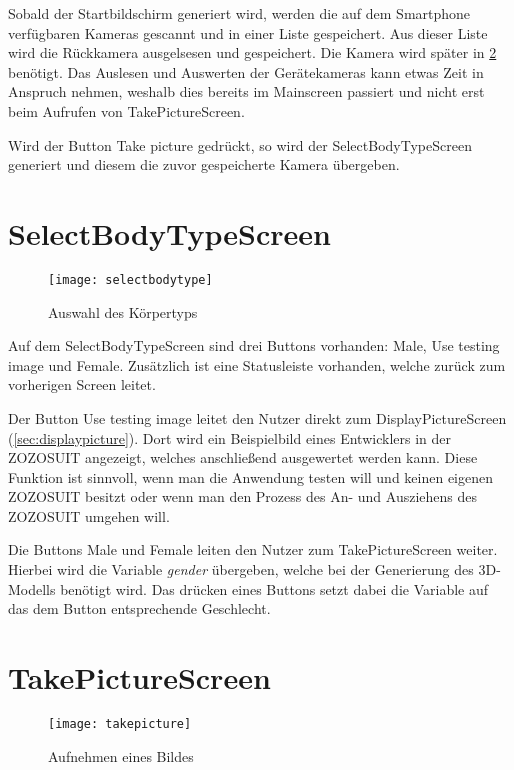 Sobald der Startbildschirm generiert wird, werden die auf dem Smartphone verfügbaren Kameras gescannt und in einer Liste gespeichert. Aus dieser Liste wird die Rückkamera 
ausgelsesen und gespeichert. Die Kamera wird später in \ref{sec:takepicture} benötigt. Das Auslesen und Auswerten der Gerätekameras kann etwas Zeit in Anspruch nehmen, weshalb dies 
bereits im Mainscreen passiert und nicht erst beim Aufrufen von TakePictureScreen.

Wird der Button \glqq{}Take picture\grqq{} gedrückt, so wird der SelectBodyTypeScreen generiert und diesem die zuvor gespeicherte Kamera übergeben.

\clearpage
\section{SelectBodyTypeScreen}
\begin{figure}[htpb]
    \centering
    \texttt{[image: selectbodytype]}
    \caption{Auswahl des Körpertyps}
    \label{img:selectbodytype}
\end{figure}

Auf dem SelectBodyTypeScreen sind drei Buttons vorhanden: \glqq{}Male\grqq{}, \glqq{}Use testing image\grqq{} und \glqq{}Female\grqq{}. Zusätzlich ist eine Statusleiste vorhanden, 
welche zurück zum vorherigen Screen leitet.

Der Button \glqq{}Use testing image\grqq{} leitet den Nutzer direkt zum DisplayPictureScreen (\ref{sec:displaypicture}). Dort wird ein Beispielbild eines Entwicklers in der ZOZOSUIT 
angezeigt, welches anschließend ausgewertet werden kann. \newline
Diese Funktion ist sinnvoll, wenn man die Anwendung testen will und keinen eigenen ZOZOSUIT besitzt oder wenn man den Prozess des An- und Ausziehens des ZOZOSUIT umgehen will.

Die Buttons \glqq{}Male\grqq{} und \glqq{}Female\grqq{} leiten den Nutzer zum TakePictureScreen weiter. Hierbei wird die Variable \textit{gender} übergeben, welche bei der Generierung 
des 3D-Modells benötigt wird. Das drücken eines Buttons setzt dabei die Variable auf das dem Button entsprechende Geschlecht.

\clearpage
\section{TakePictureScreen}
\label{sec:takepicture}
\begin{figure}[htpb]
    \centering
    \texttt{[image: takepicture]}
    \caption{Aufnehmen eines Bildes}
    \label{img:takepicture}
\end{figure}

